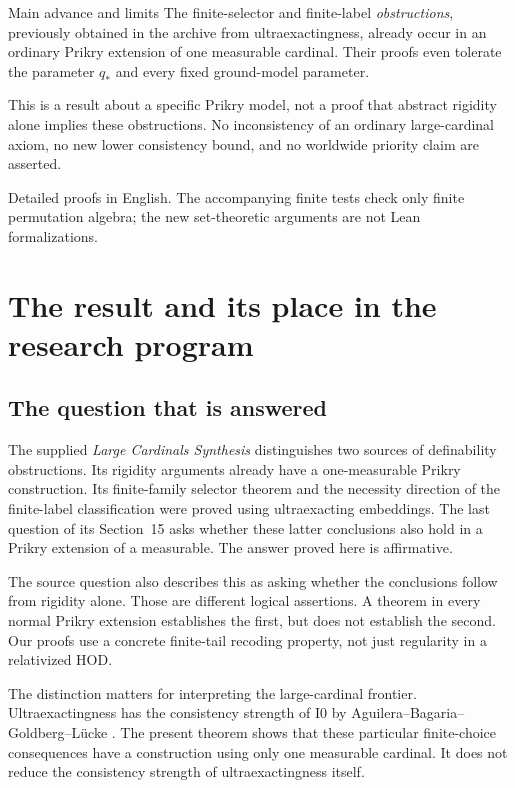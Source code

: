 \documentclass[11pt,letterpaper]{article}
\theoremstyle{definition}
\numberwithin{equation}{section}
\newcommand{\HOD}{\mathrm{HOD}}
\newcommand{\Izero}{\mathrm{I0}}
\begin{document}
\begin{assessment}{Main advance and limits}
The finite-selector and finite-label \emph{obstructions}, previously obtained
in the archive from ultraexactingness, already occur in an ordinary Prikry
extension of one measurable cardinal. Their proofs even tolerate the
parameter $q_*$ and every fixed ground-model parameter.

This is a result about a specific Prikry model, not a proof that abstract
rigidity alone implies these obstructions. No inconsistency of an ordinary
large-cardinal axiom, no new lower consistency bound, and no worldwide
priority claim are asserted.
\end{assessment}

\vfill
{\small\color{Muted}Detailed proofs in English. The accompanying finite tests check only
finite permutation algebra; the new set-theoretic arguments are not Lean formalizations.}
\newpage
\tableofcontents
\newpage

\section{The result and its place in the research program}\label{sec:overview}

\subsection{The question that is answered}

The supplied \emph{Large Cardinals Synthesis} \cite{archive} distinguishes two
sources of definability obstructions. Its rigidity arguments already have a
one-measurable Prikry construction. Its finite-family selector theorem and
the necessity direction of the finite-label classification were proved using
ultraexacting embeddings. The last question of its Section~15 asks whether
these latter conclusions also hold in a Prikry extension of a measurable.
The answer proved here is affirmative.

The source question also describes this as asking whether the conclusions
follow from rigidity alone. Those are different logical assertions. A theorem
in every normal Prikry extension establishes the first, but does not establish
the second. Our proofs use a concrete finite-tail recoding property, not just
regularity in a relativized $\HOD$.

The distinction matters for interpreting the large-cardinal frontier.
Ultraexactingness has the consistency strength of $\Izero$ by
Aguilera--Bagaria--Goldberg--L\"ucke \cite{abgl}. The present theorem shows that
these particular finite-choice consequences have a construction using only
one measurable cardinal. It does not reduce the consistency strength of
ultraexactingness itself.
\end{document}
